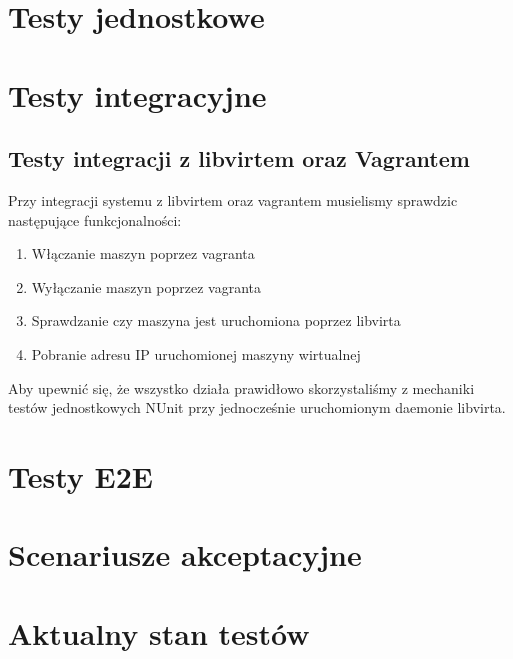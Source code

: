 \documentclass[12pt]{article}
\begin{document}

\tableofcontents

\newpage

\section{Testy jednostkowe}

\section{Testy integracyjne}

\subsection {Testy integracji z libvirtem oraz Vagrantem}
Przy integracji systemu z libvirtem oraz vagrantem musielismy sprawdzic następujące funkcjonalności:
\begin{enumerate}
	\item Włączanie maszyn poprzez vagranta
	\item Wyłączanie maszyn poprzez vagranta
	\item Sprawdzanie czy maszyna jest uruchomiona poprzez libvirta
	\item Pobranie adresu IP uruchomionej maszyny wirtualnej
\end{enumerate}

Aby upewnić się, że wszystko działa prawidłowo skorzystaliśmy z mechaniki testów jednostkowych NUnit przy jednocześnie uruchomionym daemonie libvirta.

\section{Testy E2E}

\section{Scenariusze akceptacyjne}

\section{Aktualny stan testów}
\end{document}
